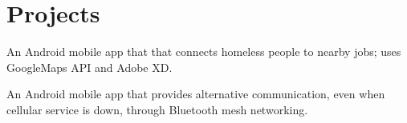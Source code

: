 \documentclass[]{hieudo-build}
\begin{document}
\begin{minipage}[t]{0.65\textwidth}


\section{Projects}

\descript{}
\begin{tightemize}
\small{}
\item An Android mobile app that that connects homeless people to nearby jobs; uses GoogleMaps API and Adobe XD.
\end{tightemize}
\sectionsep 

\descript{}
\begin{tightemize}
\small{}
\item An Android mobile app that provides alternative communication, even when cellular service is down, through Bluetooth mesh networking.
\end{tightemize}
\sectionsep 


\end{minipage}
\end{document}
